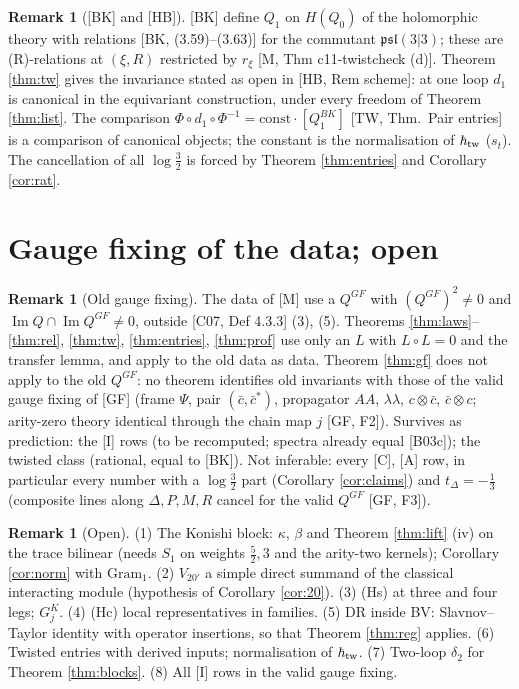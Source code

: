 \documentclass[10pt]{article}
\theoremstyle{definition}
\newtheorem{remark}[theorem]{Remark}
\begin{document}
\begin{remark}[{[BK]} and {[HB]}]
[BK] define $Q_1$ on $H(Q_0)$ of the holomorphic theory with relations [BK, (3.59)--(3.63)] for the commutant $\mathfrak{psl}(3|3)$; these are (R)-relations at $(\xi,R)$ restricted by $r_\xi$ [M, Thm c11-twistcheck (d)]. Theorem \ref{thm:tw} gives the invariance stated as open in [HB, Rem scheme]: at one loop $d_1$ is canonical in the equivariant construction, under every freedom of Theorem \ref{thm:list}. The comparison $\Phi\circ d_1\circ\Phi^{-1}=\text{const}\cdot[Q_1^{BK}]$ [TW, Thm.~Pair entries] is a comparison of canonical objects; the constant is the normalisation of $\hbar_{\rm tw}$ ($s_t$). The cancellation of all $\log\tfrac32$ is forced by Theorem \ref{thm:entries} and Corollary \ref{cor:rat}.
\end{remark}

\section{Gauge fixing of the data; open}

\begin{remark}[Old gauge fixing]\label{rem:old}
The data of [M] use a $Q^{GF}$ with $(Q^{GF})^2\ne0$ and $\operatorname{Im}Q\cap\operatorname{Im}Q^{GF}\ne0$, outside [C07, Def 4.3.3] (3), (5). Theorems \ref{thm:laws}--\ref{thm:rel}, \ref{thm:tw}, \ref{thm:entries}, \ref{thm:prof} use only an $L$ with $L\circ L=0$ and the transfer lemma, and apply to the old data as data. Theorem \ref{thm:gf} does not apply to the old $Q^{GF}$: no theorem identifies old invariants with those of the valid gauge fixing of [GF] (frame $\Psi$, pair $(\bar c,\bar c^*)$, propagator $AA$, $\lambda\lambda$, $c\otimes\bar c$, $\bar c\otimes c$; arity-zero theory identical through the chain map $j$ [GF, F2]). Survives as prediction: the [I] rows (to be recomputed; spectra already equal [B03c]); the twisted class (rational, equal to [BK]). Not inferable: every [C], [A] row, in particular every number with a $\log\tfrac32$ part (Corollary \ref{cor:claims}) and $t_\Delta=-\tfrac13$ (composite lines along $\Delta,P,M,R$ cancel for the valid $Q^{GF}$ [GF, F3]).
\end{remark}

\begin{remark}[Open]
(1) The Konishi block: $\kappa$, $\beta$ and Theorem \ref{thm:lift} (iv) on the trace bilinear (needs $S_1$ on weights $\tfrac52,3$ and the arity-two kernels); Corollary \ref{cor:norm} with $\mathrm{Gram}_1$. (2) $V_{20'}$ a simple direct summand of the classical interacting module (hypothesis of Corollary \ref{cor:20}). (3) (Hs) at three and four legs; $G^K_j$. (4) (Hc) local representatives in families. (5) DR inside BV: Slavnov--Taylor identity with operator insertions, so that Theorem \ref{thm:reg} applies. (6) Twisted entries with derived inputs; normalisation of $\hbar_{\rm tw}$. (7) Two-loop $\delta_2$ for Theorem \ref{thm:blocks}. (8) All [I] rows in the valid gauge fixing.
\end{remark}
\end{document}

